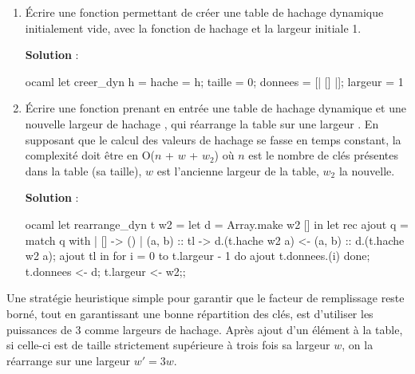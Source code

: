 \documentclass[10pt,a4paper, varwidth]{article}
\begin{document}
	\begin{enumerate}
		\item Écrire une fonction  permettant de créer une table de hachage dynamique initialement vide, 
        avec la fonction de hachage  et la largeur initiale 1.
		\if{}
        \begin{emphase}
            \textbf{Solution} : 
            \begin{center}
\begin{code}{ocaml}
let creer_dyn h =
    {hache = h; taille = 0; donnees = [| [] |]; largeur = 1}
\end{code}
            \end{center}
        \end{emphase}
        \fi 
		\item Écrire une fonction  prenant en entrée une table de hachage dynamique  et une
		nouvelle largeur de hachage , qui réarrange la table sur une largeur . En supposant que le calcul des valeurs
		de hachage se fasse en temps constant, la complexité doit être en O($n$ + $w$ + $w_2$) où $n$ est le nombre de clés
		présentes dans la table (sa taille), $w$ est l'ancienne largeur de la table, $w_2$ la nouvelle.
        \if{}
        \begin{emphase}
            \textbf{Solution} : 
            \begin{center}
\begin{code}{ocaml}
let rearrange_dyn t w2 =
    let d = Array.make w2 [] in
    let rec ajout q = match q with
        | [] -> ()
        | (a, b) :: tl -> d.(t.hache w2 a) <- (a, b) :: d.(t.hache w2 a);
                          ajout tl in
    for i = 0 to t.largeur - 1 do
        ajout t.donnees.(i)
    done;
    t.donnees <- d;
    t.largeur <- w2;;    
\end{code}
            \end{center}
        \end{emphase}
        \fi
	\end{enumerate}
	Une stratégie heuristique simple pour garantir que le facteur de remplissage reste borné, tout en garantissant
	une bonne répartition des clés, est
	d'utiliser les puissances de 3 comme largeurs de hachage. Après ajout d'un élément à la table, si celle-ci est de
	taille strictement supérieure à trois fois sa largeur $w$, on la réarrange sur une largeur $w′ = 3w$.
\end{document}
